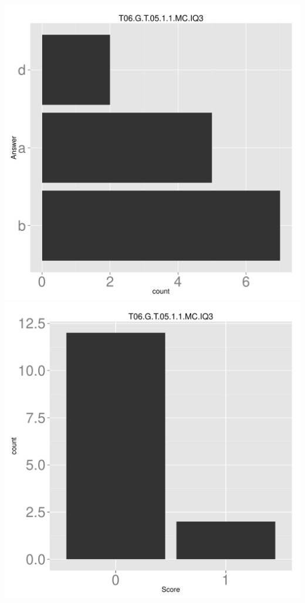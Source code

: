 \documentclass[12pt,english,nohyper]{tufte-handout}\usepackage[]{graphicx}\usepackage[]{color}
\begin{document}
\begin{center} \includegraphics[width=.45\linewidth]{Topic06_AB_82_answer} \includegraphics[width=.45\linewidth]{Topic06_AB_82_score} \end{center} 
\end{document}
